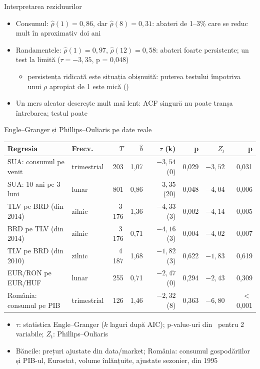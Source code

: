 \begin{frame}{Interpretarea reziduurilor}
\itemsize{\small}
\begin{itemize}
    \item Consumul: $\hat\rho(1) = 0{,}86$, dar $\hat\rho(8) = 0{,}31$: abateri de 1--3\% care se reduc mult în aproximativ doi ani
    \item Randamentele: $\hat\rho(1) = 0{,}97$, $\hat\rho(12) = 0{,}58$: abateri foarte persistente; un test la limită ($\tau = -3{,}35$, p = 0{,}048)
    \begin{itemize}
        \item persistența ridicată este situația obișnuită: puterea testului împotriva unui $\rho$ apropiat de 1 este mică ()
    \end{itemize}
    \item Un mers aleator descrește mult mai lent: ACF singură nu poate tranșa întrebarea; testul poate
\end{itemize}
\end{frame}

\begin{frame}{Engle--Granger și Phillips--Ouliaris pe date reale}
\itemsize{\small}
\begin{center}
\scriptsize
\begin{tabular}{llrrrrrr}
\toprule
\textbf{Regresia} & \textbf{Frecv.} & $T$ & $\hat b$ & $\tau$ (k) & p & $Z_t$ & p \\
\midrule
SUA: consumul pe venit & trimestrial & 203 & 1{,}07 & $-3{,}54$ (0) & 0{,}029 & $-3{,}52$ & 0{,}031 \\
SUA: 10 ani pe 3 luni & lunar & 801 & 0{,}86 & $-3{,}35$ (20) & 0{,}048 & $-4{,}04$ & 0{,}006 \\
TLV pe BRD (din 2014) & zilnic & 3\,176 & 1{,}36 & $-4{,}33$ (3) & 0{,}002 & $-4{,}14$ & 0{,}005 \\
BRD pe TLV (din 2014) & zilnic & 3\,176 & 0{,}71 & $-4{,}16$ (3) & 0{,}004 & $-4{,}02$ & 0{,}007 \\
TLV pe BRD (din 2010) & zilnic & 4\,187 & 1{,}68 & $-1{,}82$ (3) & 0{,}622 & $-1{,}83$ & 0{,}619 \\
EUR/RON pe EUR/HUF & lunar & 255 & 0{,}71 & $-2{,}47$ (0) & 0{,}294 & $-2{,}43$ & 0{,}309 \\
România: consumul pe PIB & trimestrial & 126 & 1{,}46 & $-2{,}32$ (8) & 0{,}363 & $-6{,}80$ & $<$\,0{,}001 \\
\bottomrule
\end{tabular}
\end{center}
\begin{itemize}
    \item $\tau$: statistica Engle--Granger ($k$ laguri după AIC); p-value-uri din \ pentru 2 variabile; $Z_t$: Phillips--Ouliaris
    \item Băncile: prețuri ajustate din data/market; România: consumul gospodăriilor și PIB-ul, Eurostat, volume înlănțuite, ajustate sezonier, din 1995
\end{itemize}
\end{frame}

